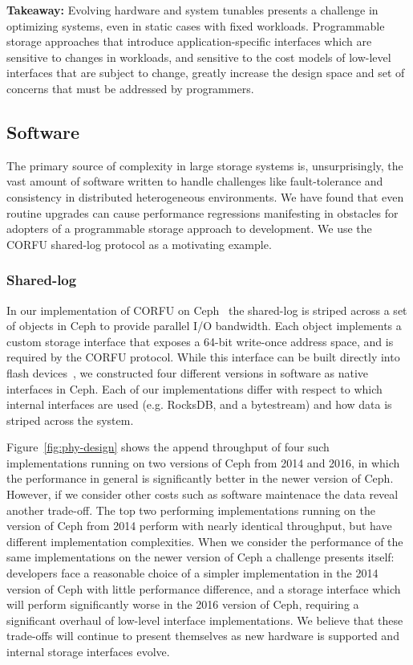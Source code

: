 \textbf{Takeaway:} Evolving hardware and system tunables presents a challenge
in optimizing systems, even in static cases with fixed workloads. Programmable
storage approaches that introduce application-specific interfaces which are
sensitive to changes in workloads, and sensitive to the cost models of
low-level interfaces that are subject to change, greatly increase the design
space and set of concerns that must be addressed by programmers.

\subsection{Software}

The primary source of complexity in large storage systems is, unsurprisingly,
the vast amount of software written to handle challenges like fault-tolerance
and consistency in distributed heterogeneous environments. We have found that
even routine upgrades can cause performance regressions manifesting in obstacles 
for adopters of a programmable storage approach to development. We use the
CORFU shared-log protocol as a motivating example.

\subsubsection{Shared-log}

In our implementation of CORFU on Ceph~\cite{zlog} the shared-log is striped
across a set of objects in Ceph to provide parallel I/O bandwidth. Each object
implements a custom storage interface that exposes a 64-bit write-once address
space, and is required by the CORFU protocol.  While this interface can be
built directly into flash devices~\cite{wei:systor13}, we constructed four
different versions in software as native interfaces in Ceph. Each of our
implementations differ with respect to which internal interfaces are used
(e.g. RocksDB, and a bytestream) and how data is striped across the system.

Figure~\ref{fig:phy-design} shows the append throughput of four such
implementations running on two versions of Ceph from 2014 and 2016, in which
the performance in general is significantly better in the newer version of
Ceph. However, if we consider other costs such as software maintenace the data
reveal another trade-off. The top two performing implementations running on
the version of Ceph from 2014 perform with nearly identical throughput, but
have different implementation complexities. When we consider the performance
of the same implementations on the newer version of Ceph a challenge presents
itself: developers face a reasonable choice of a simpler implementation in the
2014 version of Ceph with little performance difference, and a storage
interface which will perform significantly worse in the 2016 version of Ceph,
requiring a significant overhaul of low-level interface implementations. We
believe that these trade-offs will continue to present themselves as new
hardware is supported and internal storage interfaces evolve.

